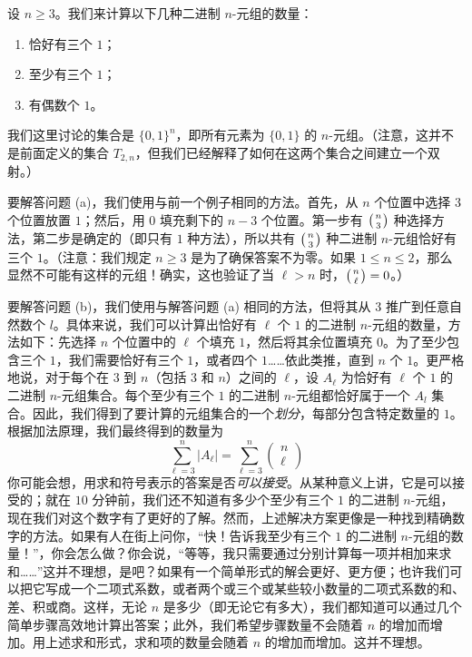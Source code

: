 \begin{example}
    设 $n \ge 3$。我们来计算以下几种二进制 $n$-元组的数量：
    \begin{enumerate}[label=(\alph*)]
        \item 恰好有三个 $1$；
        \item 至少有三个 $1$；
        \item 有偶数个 $1$。
    \end{enumerate}

    我们这里讨论的集合是 $\{0, 1\}^n$，即所有元素为 $\{0, 1\}$ 的 $n$-元组。（注意，这并不是前面定义的集合 $T_{2,n}$，但我们已经解释了如何在这两个集合之间建立一个双射。）

    要解答问题 (a)，我们使用与前一个例子相同的方法。首先，从 $n$ 个位置中选择 $3$ 个位置放置 $1$；然后，用 $0$ 填充剩下的 $n-3$ 个位置。第一步有 $\big({n \atop 3}\big)$ 种选择方法，第二步是确定的（即只有 $1$ 种方法），所以共有 $\big({n \atop 3}\big)$ 种二进制 $n$-元组恰好有三个 $1$。（注意：我们规定 $n \ge 3$ 是为了确保答案不为零。如果 $1 \le n \le 2$，那么显然不可能有这样的元组！确实，这也验证了当 $\ell > n$ 时，$\big({n \atop \ell}\big) = 0$。）

    要解答问题 (b)，我们使用与解答问题 (a) 相同的方法，但将其从 $3$ 推广到任意自然数个 $l$。具体来说，我们可以计算出恰好有 $\ell$ 个 $1$ 的二进制 $n$-元组的数量，方法如下：先选择 $n$ 个位置中的 $\ell$ 个填充 $1$，然后将其余位置填充 $0$。为了至少包含三个 $1$，我们需要恰好有三个 $1$，或者四个 $1$……依此类推，直到 $n$ 个 $1$。更严格地说，对于每个在 $3$ 到 $n$（包括 $3$ 和 $n$）之间的 $\ell$，设 $A_\ell$ 为恰好有 $\ell$ 个 $1$ 的二进制 $n$-元组集合。每个至少有三个 $1$ 的二进制 $n$-元组都恰好属于一个 $A_l$ 集合。因此，我们得到了要计算的元组集合的一个\emph{划分}，每部分包含特定数量的 $1$。根据加法原理，我们最终得到的数量为
    \[\sum_{\ell = 3}^{n} |A_\ell| = \sum_{\ell = 3}^{n} \begin{pmatrix}
            n \\
            \ell
        \end{pmatrix}\]
    你可能会想，用求和符号表示的答案是否\emph{可以接受}。从某种意义上讲，它是可以接受的；就在 $10$ 分钟前，我们还不知道有多少个至少有三个 $1$ 的二进制 $n$-元组，现在我们对这个数字有了更好的了解。然而，上述解决方案更像是一种找到精确数字的方法。如果有人在街上问你，``快！告诉我至少有三个 $1$ 的二进制 $n$-元组的数量！''，你会怎么做？你会说，``等等，我只需要通过分别计算每一项并相加来求和……''这并不理想，是吧？如果有一个简单形式的解会更好、更方便；也许我们可以把它写成一个二项式系数，或者两个或三个或某些较小数量的二项式系数的和、差、积或商。这样，无论 $n$ 是多少（即无论它有多大），我们都知道可以通过几个简单步骤高效地计算出答案；此外，我们希望步骤数量不会随着 $n$ 的增加而增加。用上述求和形式，求和项的数量会随着 $n$ 的增加而增加。这并不理想。


\end{example}
